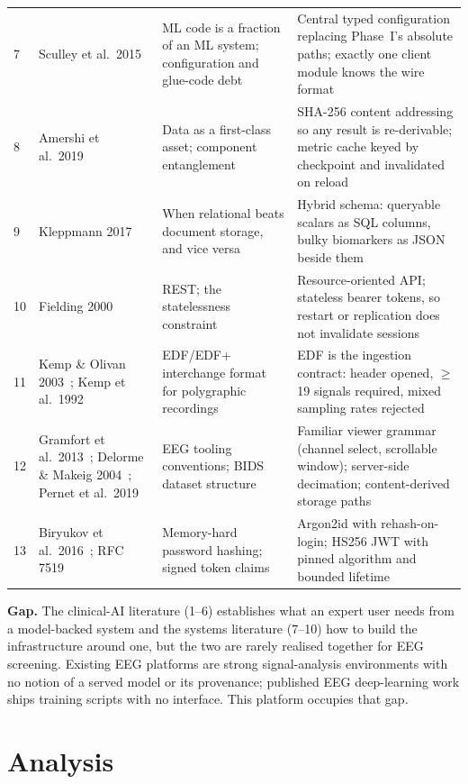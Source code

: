\documentclass[11pt,a4paper]{article}
\begin{document}
\begin{table}[H]
\begin{tabularx}{\linewidth}{@{}C{0.5cm} L{3.2cm} L{3.2cm} Y@{}}
7 & Sculley et al.\ 2015~\cite{sculley2015} & ML code is a fraction of an ML system; configuration and glue-code debt & Central typed configuration replacing Phase~I's absolute paths; exactly one client module knows the wire format \\
8 & Amershi et al.\ 2019~\cite{amershi2019} & Data as a first-class asset; component entanglement & SHA-256 content addressing so any result is re-derivable; metric cache keyed by checkpoint and invalidated on reload \\
9 & Kleppmann 2017~\cite{kleppmann2017} & When relational beats document storage, and vice versa & Hybrid schema: queryable scalars as SQL columns, bulky biomarkers as JSON beside them \\
10 & Fielding 2000~\cite{fielding2000} & REST; the statelessness constraint & Resource-oriented API; stateless bearer tokens, so restart or replication does not invalidate sessions \\
11 & Kemp \& Olivan 2003~\cite{kemp2003}; Kemp et al.\ 1992~\cite{kemp1992} & EDF/EDF+ interchange format for polygraphic recordings & EDF is the ingestion contract: header opened, $\geq$19 signals required, mixed sampling rates rejected \\
12 & Gramfort et al.\ 2013~\cite{gramfort2013}; Delorme \& Makeig 2004~\cite{delorme2004}; Pernet et al.\ 2019~\cite{pernet2019} & EEG tooling conventions; BIDS dataset structure & Familiar viewer grammar (channel select, scrollable window); server-side decimation; content-derived storage paths \\
13 & Biryukov et al.\ 2016~\cite{biryukov2016}; RFC 7519~\cite{rfc7519} & Memory-hard password hashing; signed token claims & Argon2id with rehash-on-login; HS256 JWT with pinned algorithm and bounded lifetime \\
\bottomrule
\end{tabularx}
\end{table}

\textbf{Gap.} The clinical-AI literature (1--6) establishes what an expert user
needs from a model-backed system and the systems literature (7--10) how to build
the infrastructure around one, but the two are rarely realised together for EEG
screening. Existing EEG platforms are strong signal-analysis environments with
no notion of a served model or its provenance; published EEG deep-learning work
ships training scripts with no interface. This platform occupies that gap.

\section{Analysis}
\end{document}
